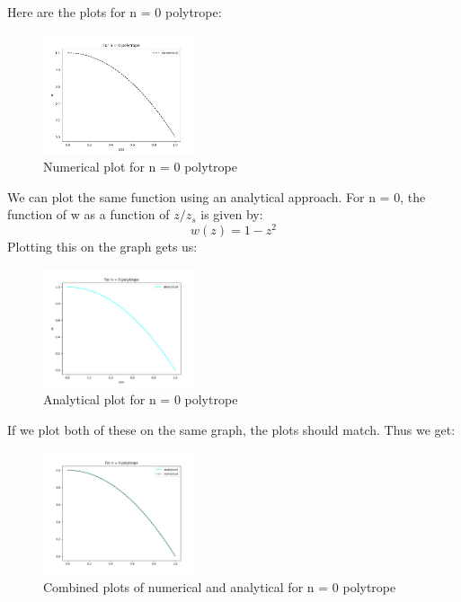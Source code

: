 \documentclass[10pt]{article}
\begin{document}
Here are the plots for n = 0 polytrope:
\begin{figure}[H]
    \centering
    \includegraphics[width=0.4\textwidth]{polytrope_n_0_numerical.png}
    \caption{Numerical plot for n = 0 polytrope}
    \label{fig:enter-label}
\end{figure}
We can plot the same function using an analytical approach. For n = 0, the function of w as a function of $z/z_{s}$ is given by:
\[ w(z) = 1 - z^2\]
Plotting this on the graph gets us:

\begin{figure}[H]
    \centering
    \includegraphics[width=0.4\textwidth]{polytrope_n_0_analytical.png}
    \caption{Analytical plot for n = 0 polytrope}
    \label{fig:enter-label}
\end{figure}

If we plot both of these on the same graph, the plots should match. Thus we get:

\begin{figure}[H]
    \centering
    \includegraphics[width=0.4\textwidth]{polytrope_n_0.png}
    \caption{Combined plots of numerical and analytical for n = 0 polytrope}
    \label{fig:enter-label}
\end{figure}
\end{document}
